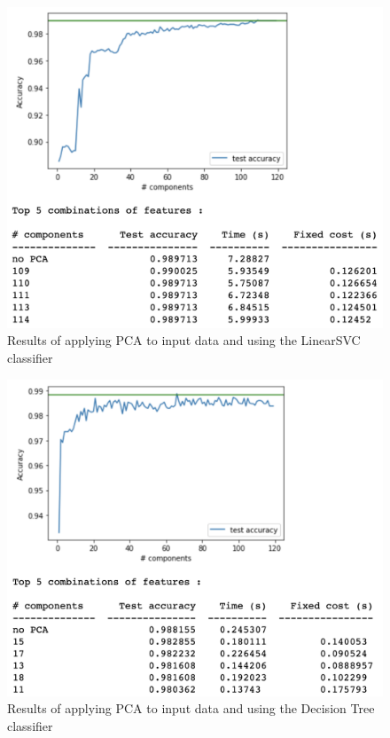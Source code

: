 \begin{appendix}
    \begin{figure}[!ht]
    \centering
      \includegraphics[width=0.68\linewidth]{Figures/linearsvc_pca.png}
      \captionsetup{justification=centering}
      \caption{Results of applying PCA to input data and using the LinearSVC classifier}
      \label{fig:linearsvc_pca}
    \end{figure}
    
    \begin{figure}[!ht]
    \centering
      \includegraphics[width=0.68\linewidth]{Figures/decisiontree_pca.png}
      \caption{Results of applying PCA to input data and using the Decision Tree classifier}
      \label{fig:decisiontree_pca}
    \end{figure}
    

\end{appendix}
